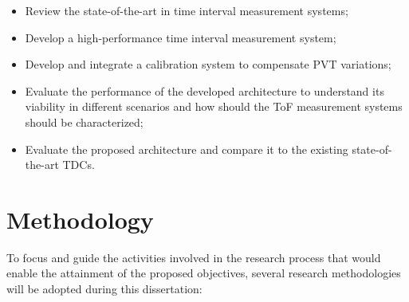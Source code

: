 \begin{itemize}
    \item Review the state-of-the-art in time interval measurement systems;
    \item Develop a high-performance time interval measurement system;
    \item Develop and integrate a calibration system to compensate \gls{PVT} variations;
    \item Evaluate the performance of the developed architecture to understand its viability in different scenarios and how should the \gls{ToF} measurement systems should be characterized;
    \item Evaluate the proposed architecture and compare it to the existing state-of-the-art \glspl{TDC}.
\end{itemize}


\section{Methodology} %
\label{sec:methodology}

To focus and guide the activities involved in the research process that would enable the attainment of the proposed objectives, several research methodologies will be adopted during this dissertation:

